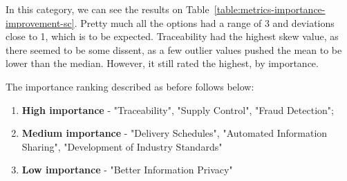 
In this category, we can see the results on Table~\ref{table:metrics-importance-improvement-sc}. Pretty much all the options had a range of 3 and deviations close to 1, which is to be expected. Traceability had the highest skew value, as there seemed to be some dissent, as a few outlier values pushed the mean to be lower than the median. However, it still rated the highest, by importance. 

The importance ranking described as before follows below:

\begin{enumerate}
    \item \textbf{High importance} - "Traceability", "Supply Control", "Fraud Detection";
    \item \textbf{Medium importance} - "Delivery Schedules", "Automated Information Sharing", "Development of Industry Standards"
    \item \textbf{Low importance} - "Better Information Privacy"
\end{enumerate}

